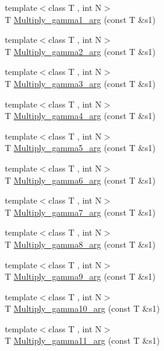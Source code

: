 \begin{DoxyCompactItemize}
\item 
{\footnotesize template$<$class T , int N$>$ }\\T \mbox{\hyperlink{namespaceENSEM_a98f0db7dcdeff4267b1a6f0c13360ba0}{Multiply\+\_\+gamma1\+\_\+arg}} (const T \&s1)
\item 
{\footnotesize template$<$class T , int N$>$ }\\T \mbox{\hyperlink{namespaceENSEM_a0bf52041fa6010680a898ffed180b575}{Multiply\+\_\+gamma2\+\_\+arg}} (const T \&s1)
\item 
{\footnotesize template$<$class T , int N$>$ }\\T \mbox{\hyperlink{namespaceENSEM_a7c6afb65951edae0d204cbe21535a2a5}{Multiply\+\_\+gamma3\+\_\+arg}} (const T \&s1)
\item 
{\footnotesize template$<$class T , int N$>$ }\\T \mbox{\hyperlink{namespaceENSEM_a2916fde58e73dd7198d447fe45384334}{Multiply\+\_\+gamma4\+\_\+arg}} (const T \&s1)
\item 
{\footnotesize template$<$class T , int N$>$ }\\T \mbox{\hyperlink{namespaceENSEM_aa00dbaa87256bd8e2480f91ceb976cb6}{Multiply\+\_\+gamma5\+\_\+arg}} (const T \&s1)
\item 
{\footnotesize template$<$class T , int N$>$ }\\T \mbox{\hyperlink{namespaceENSEM_adbf26a395689fc53e7ec3c67b7512160}{Multiply\+\_\+gamma6\+\_\+arg}} (const T \&s1)
\item 
{\footnotesize template$<$class T , int N$>$ }\\T \mbox{\hyperlink{namespaceENSEM_afef63b4334aa17ecf19ae4b2022d735f}{Multiply\+\_\+gamma7\+\_\+arg}} (const T \&s1)
\item 
{\footnotesize template$<$class T , int N$>$ }\\T \mbox{\hyperlink{namespaceENSEM_acafd9841429af6b6b6f2021fb85011f2}{Multiply\+\_\+gamma8\+\_\+arg}} (const T \&s1)
\item 
{\footnotesize template$<$class T , int N$>$ }\\T \mbox{\hyperlink{namespaceENSEM_a9549bbaa92e4e60d143426d3a4cfe161}{Multiply\+\_\+gamma9\+\_\+arg}} (const T \&s1)
\item 
{\footnotesize template$<$class T , int N$>$ }\\T \mbox{\hyperlink{namespaceENSEM_a42393303080da191decc1e01988b62db}{Multiply\+\_\+gamma10\+\_\+arg}} (const T \&s1)
\item 
{\footnotesize template$<$class T , int N$>$ }\\T \mbox{\hyperlink{namespaceENSEM_af5e60b5893c30408a3b7d3da5b7c5f6e}{Multiply\+\_\+gamma11\+\_\+arg}} (const T \&s1)

\end{DoxyCompactItemize}
